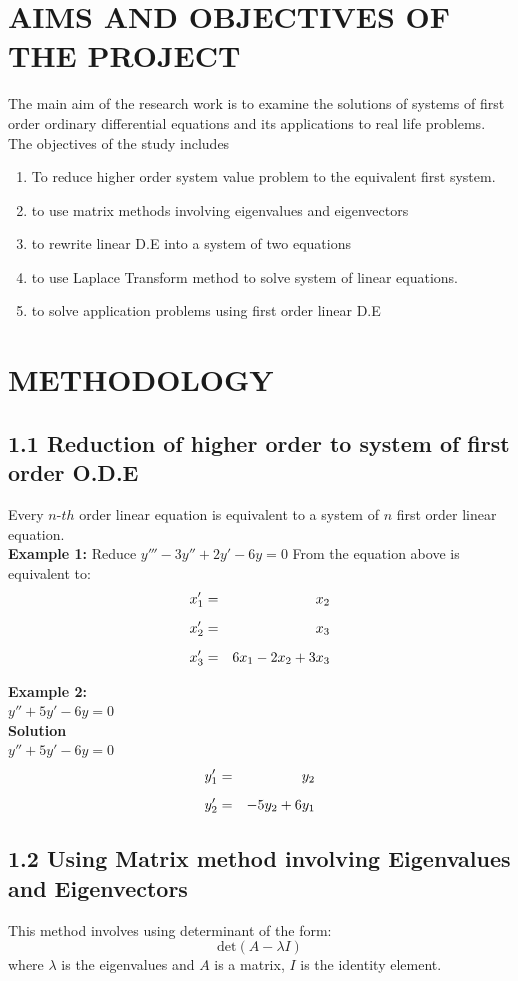 \documentclass[12pt]{report}
\newcommand{\bt}[1]{\textbf{#1}}
\newcommand{\sps}{\\[0.2cm]}
\newcommand{\NI}{\noindent}
\newcommand{\sprime}{'}
\newcommand{\dprime}{''}
\newcommand{\tprime}{'''}
\begin{document}
	\section*{AIMS AND OBJECTIVES OF THE PROJECT}
	The main aim of the research work is to examine the solutions of systems of first order ordinary differential equations and its applications to real life problems.\sps
	The objectives of the study includes
	\begin{enumerate}
		\item To reduce higher order system value problem to the equivalent first system.
		
		\item to use matrix methods involving eigenvalues and eigenvectors
		
		\item to rewrite linear D.E into a system of two equations
		
		\item to use Laplace Transform method to solve system of linear equations.
		
		\item to solve application problems using first order linear D.E
	\end{enumerate}
	
	\section*{METHODOLOGY}
	\subsection*{1.1 Reduction of higher order to system of first order O.D.E}
	Every $n\mbox{-}th$ order linear equation is equivalent to a system of $n$ first order linear equation.\sps
	
	\NI\bt{Example 1:} Reduce $y\tprime - 3y\dprime + 2y\sprime - 6y = 0$
	From the equation above is equivalent to:
	\begin{eqnarray}
		x\sprime_1 &=& x_2\notag\sps
		x\sprime_2 &=& x_3\notag\sps
		x\sprime_3 &=& 6x_1 - 2x_2 + 3x_3\notag
	\end{eqnarray}
	
	\NI\bt{Example 2:}\sps
	$y\dprime + 5y\sprime - 6y = 0$\sps
	\bt{Solution}\sps
	$y\dprime + 5y\sprime - 6y = 0$
	\begin{eqnarray}
		y\sprime_1 &=& y_2\notag\sps
		y\sprime_2 &=& -5y_2 + 6y_1 \notag
	\end{eqnarray}
	
	
	\subsection*{1.2 Using Matrix method involving Eigenvalues and Eigenvectors}
	This method involves using determinant of the form: 
	\begin{equation*}
		\mathrm{det}(A-\lambda I)
	\end{equation*}
	where $\lambda$ is the eigenvalues and $A$ is a matrix, $I$ is the identity element.\sps
	
\end{document}
